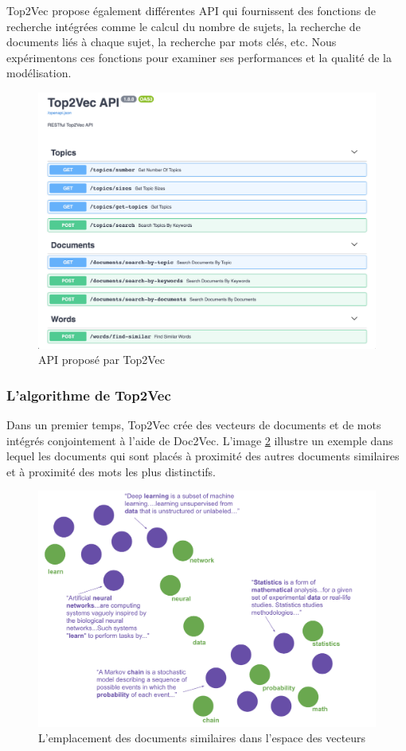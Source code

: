 Top2Vec propose également différentes API qui fournissent des fonctions de recherche intégrées comme le calcul du nombre de sujets, la recherche de documents liés à chaque sujet, la recherche par mots clés, etc. Nous expérimentons ces fonctions pour examiner ses performances et la qualité de la modélisation.

\begin{figure}[H] %
    \centering
    \includegraphics[width=12cm]{img/3.1.restful-top2vec.png}
    \caption{API proposé par Top2Vec}
    \label{fig:api_top2vec}
\end{figure}

\subsubsection{L'algorithme de Top2Vec}
Dans un premier temps, Top2Vec crée des vecteurs de documents et de mots intégrés conjointement à l'aide de Doc2Vec. L'image \ref{fig:docword} illustre un exemple dans lequel les documents qui sont placés à proximité des autres documents similaires et à proximité des mots les plus distinctifs.

\begin{figure}[H] %
    \centering
    \includegraphics[width=12cm]{img/doc_word_embedding.png}
    \caption{L'emplacement des documents similaires dans l'espace des vecteurs}
    \label{fig:docword}
\end{figure}

